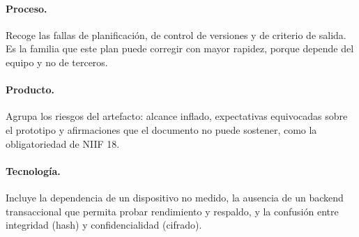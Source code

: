 \paragraph{Proceso.} Recoge las fallas de planificación, de control de
versiones y de criterio de salida. Es la familia que este plan puede
corregir con mayor rapidez, porque depende del equipo y no de terceros.

\paragraph{Producto.} Agrupa los riesgos del artefacto: alcance inflado,
expectativas equivocadas sobre el prototipo y afirmaciones que el documento
no puede sostener, como la obligatoriedad de NIIF 18.

\paragraph{Tecnología.} Incluye la dependencia de un dispositivo no medido,
la ausencia de un backend transaccional que permita probar rendimiento y
respaldo, y la confusión entre integridad (hash) y confidencialidad
(cifrado).

